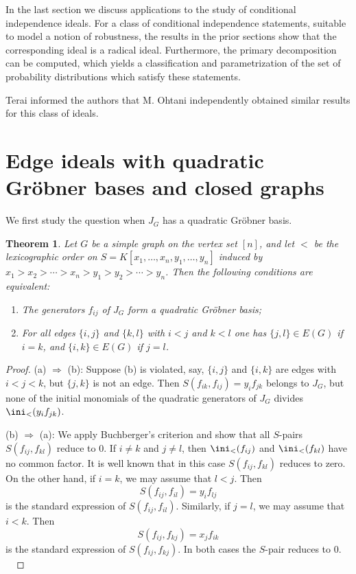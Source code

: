 \documentclass[11pt]{amsart}
\newtheorem{Theorem}{Theorem}[section]
\begin{document}
In the last section we discuss applications to the study of
conditional independence ideals. For a class of conditional independence statements, suitable to model a notion of
robustness, the results in the prior sections show that the corresponding ideal is a radical ideal.  Furthermore, the
primary decomposition can be computed, which yields a classification and parametrization of the set of probability
distributions which satisfy these statements.

Terai informed the authors that M. Ohtani \cite{Oh} independently obtained similar results for this class of ideals.



\section{Edge ideals with quadratic Gr\"obner bases and closed graphs}

We first study  the question when $J_G$ has a quadratic Gr\"obner basis.


\begin{Theorem}
\label{quadratic}
Let $G$ be a simple graph on the vertex set $[n]$, and let $<$ be the lexicographic order on $S=K[x_1,\ldots,x_n,y_1,\ldots,y_n]$ induced by $x_1>x_2>\cdots >x_n>y_1>y_2>\cdots >y_n$. Then the  following conditions are equivalent:
\begin{enumerate}
\item[{\em (a)}] The generators $f_{ij}$ of $J_G$ form  a quadratic Gr\"obner basis;
\item[{\em (b)}] For all edges   $\{i,j\}$ and $\{k,l\}$ with $i<j$ and $k<l$ one has  $\{j,l\}\in E(G)$ if $i=k$, and $\{i,k\}\in E(G)$ if $j=l$.
\end{enumerate}
\end{Theorem}



\begin{proof}
(a) $\Rightarrow$ (b): Suppose (b) is violated, say, $\{i,j\}$ and $\{i,k\}$ are edges with $i<j<k$, but $\{j,k\}$ is not an edge. Then $S(f_{ik},f_{ij})=y_if_{jk}$ belongs to $J_G$, but none of the initial monomials of the  quadratic generators of $J_G$  divides $\ini_<(y_if_{jk})$.

(b) $\Rightarrow$ (a): We apply Buchberger's criterion and show that all $S$-pairs $S(f_{ij},f_{kl})$ reduce to  $0$. If $i\neq k$ and $j\neq l$, then $\ini_<(f_{ij})$  and $\ini_<(f_{kl})$ have no common factor. It is well known that in this case $S(f_{ij},f_{kl})$ reduces to  zero.
On the other hand, if $i=k$, we may assume that $l<j$. Then
\[
S(f_{ij},f_{il})=y_if_{lj}
\]
is the standard expression of $S(f_{ij},f_{il})$. Similarly, if $j=l$, we may assume that $i<k$. Then
\[
S(f_{ij},f_{kj})=x_jf_{ik}
\]
is the standard expression of $S(f_{ij},f_{kj})$. In both cases the $S$-pair reduces to  $0$.
\, \, \, \,
\end{proof}
\end{document}
